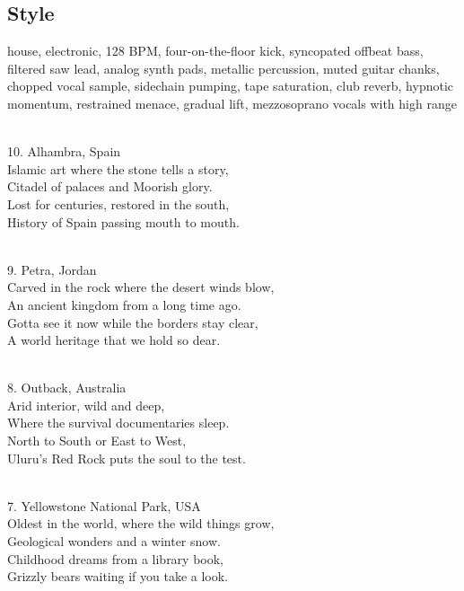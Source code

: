 \subsection{Style}
house, electronic, 128 BPM, four-on-the-floor kick, syncopated offbeat bass, filtered saw lead, analog synth pads, metallic percussion, muted guitar chanks, chopped vocal sample, sidechain pumping, tape saturation, club reverb, hypnotic momentum, restrained menace, gradual lift, mezzosoprano vocals with high range

\begin{lyrics}

\\
10. Alhambra, Spain
\\
Islamic art where the stone tells a story,\\
Citadel of palaces and Moorish glory.\\
Lost for centuries, restored in the south,\\
History of Spain passing mouth to mouth.

\\
9. Petra, Jordan
\\
Carved in the rock where the desert winds blow,\\
An ancient kingdom from a long time ago.\\
Gotta see it now while the borders stay clear,\\
A world heritage that we hold so dear.

\\
8. Outback, Australia
\\
Arid interior, wild and deep,\\
Where the survival documentaries sleep.\\
North to South or East to West,\\
Uluru’s Red Rock puts the soul to the test.

\\
7. Yellowstone National Park, USA
\\
Oldest in the world, where the wild things grow,\\
Geological wonders and a winter snow.\\
Childhood dreams from a library book,\\
Grizzly bears waiting if you take a look.


\end{lyrics}
